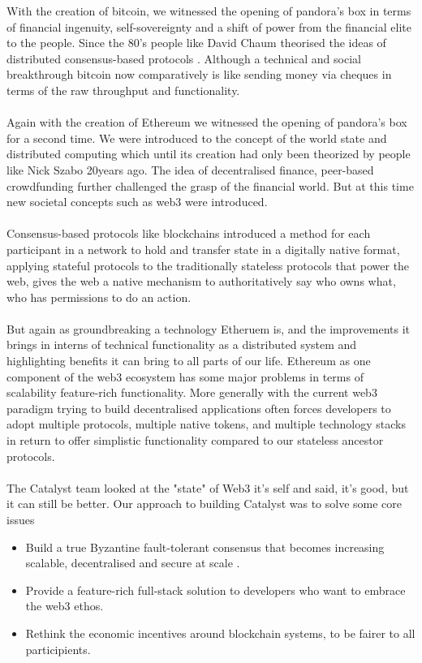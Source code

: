 With the creation of bitcoin, we witnessed the opening of pandora's box in terms of financial ingenuity, self-sovereignty and a shift of power from the financial elite to the people. Since the 80's people like David Chaum theorised the ideas of distributed consensus-based protocols \cite{chaum1979computer}. Although a technical and social breakthrough bitcoin now comparatively is like sending money via cheques in terms of the raw throughput and functionality.
\\\\
Again with the creation of Ethereum \cite{wood2014ethereum} we witnessed the opening of pandora's box for a second time. We were introduced to the concept of the world state and distributed computing which until its creation had only been theorized by people like Nick Szabo 20years ago. The idea of decentralised finance, peer-based crowdfunding further challenged the grasp of the financial world. But at this time new societal concepts such as web3 were introduced.
\\\\
Consensus-based protocols like blockchains introduced a method for each participant in a network to hold and transfer state in a digitally native format, applying stateful protocols to the traditionally stateless protocols that power the web, gives the web a native mechanism to authoritatively say who owns what, who has permissions to do an action.
\\\\
But again as groundbreaking a technology Etheruem is, and the improvements it brings in interns of technical functionality as a distributed system and highlighting benefits it can bring to all parts of our life. Ethereum as one component of the web3 ecosystem has some major problems in terms of scalability feature-rich functionality. More generally with the current web3 paradigm trying to build decentralised applications often forces developers to adopt multiple protocols, multiple native tokens, and multiple technology stacks in return to offer simplistic functionality compared to our stateless ancestor protocols.
\\\\
The Catalyst team looked at the "state" of Web3 it's self and said, it's good, but it can still be better. 
Our approach to building Catalyst was to solve some core issues

\begin{itemize}
\item Build a true Byzantine fault-tolerant consensus that becomes increasing scalable, decentralised and secure at scale  .
\item Provide a feature-rich full-stack solution to developers who want to embrace the web3 ethos.
\item Rethink the economic incentives around blockchain systems, to be fairer to all participients.
\end{itemize}


